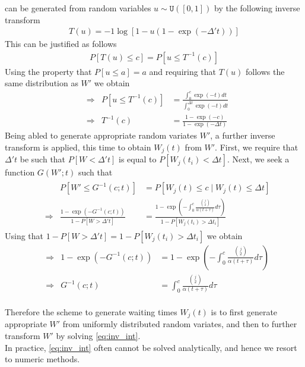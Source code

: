 \documentclass{report}
\theoremstyle{definition}
\begin{document}
can be generated from random variables $u \sim \texttt{U}([0,1])$ by the following inverse transform
\begin{gather}
T(u) = -1\log[1-u(1-\exp(-\Delta' t))]
\end{gather} 
This can be justified as follows
\begin{gather*}
  P[T(u)\leq c] = P[u\leq T^{-1}(c)]
\end{gather*}
Using the property that $P[u\leq a] = a$ and requiring that $T(u)$ follows the same distribution as $W'$ we obtain
\begin{align*}
  &\Rightarrow& P[u\leq T^{-1}(c)] &= \frac{\int_0^c\exp(- t)dt}{\int_0^{\Delta t}\exp(- t)dt}\\
  &\Rightarrow& T^{-1}(c) &= \frac{1-\exp(- c)}{1-\exp(- \Delta t)}
\end{align*}
Being abled to generate appropriate random variates $W'$, a further inverse transform is applied, this time to obtain $W_j(t)$ from $W'$. First, we require that $\Delta' t$ be such that $P[W < \Delta' t]$ is equal to $P[W_j(t_i) < \Delta t]$. Next, we seek a function $G(W';t)$ such that
\begin{gather}
\begin{aligned}
&&P[W' \leq G^{-1}(c;t)] &= P[W_j(t) \leq c \mid W_j(t)\leq\Delta t]\\
&\Rightarrow& \frac{1-\exp(-G^{-1}(c;t))}{1-P[W > \Delta't]} &= \frac{1-\exp(-\int_{0}^{c}{\frac{\binom{j}{2}}{\alpha(t+\tau)}d\tau})}{1-P[W_j(t_i) > \Delta t_i]}
\end{aligned}
\end{gather}
Using that $1-P[W > \Delta't] = 1-P[W_j(t_i) > \Delta t_i]$ we obtain
\begin{align}
&\Rightarrow& 1-\exp(-G^{-1}(c;t)) &= 1-\exp(-\int_{0}^{c}{\frac{\binom{j}{2}}{\alpha(t+\tau)}d\tau})\\
&\Rightarrow& G^{-1}(c;t) &= \int_{0}^{c}{\frac{\binom{j}{2}}{\alpha(t+\tau)}d\tau}\label{eq:inv_int}
\end{align}\\
Therefore the scheme to generate waiting times $W_j(t)$ is to first generate appropriate $W'$ from uniformly distributed random variates, and then to further transform $W'$ by solving \ref{eq:inv_int}.\\
In practice, \ref{eq:inv_int} often cannot be solved analytically, and hence we resort to numeric methods.
\end{document}
